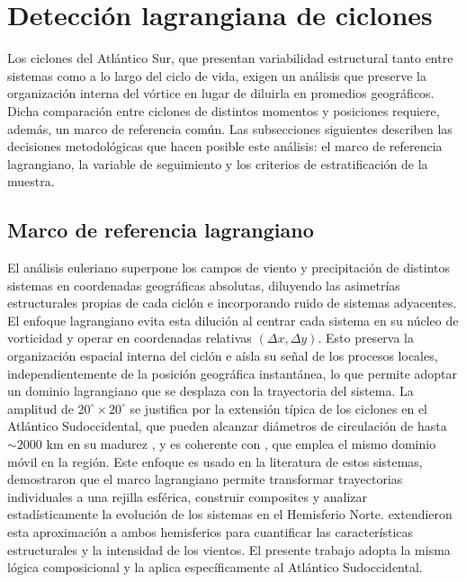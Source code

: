 \section{Detección lagrangiana de ciclones}\label{sec:tb_vorticidad}
Los ciclones del Atlántico Sur, que presentan variabilidad estructural tanto entre sistemas como a lo largo del ciclo de vida,
exigen un análisis que preserve la organización interna del vórtice en lugar de diluirla en promedios geográficos. 
Dicha comparación entre ciclones de distintos momentos y posiciones requiere, además, un marco de referencia común. 
Las subsecciones siguientes describen las decisiones metodológicas que hacen posible este análisis: el marco de referencia lagrangiano, la variable de seguimiento y los criterios de estratificación de la muestra.

\subsection{Marco de referencia lagrangiano}\label{subsec:tb_lagrangiano}
El análisis euleriano superpone los campos de viento y precipitación de distintos sistemas en coordenadas geográficas absolutas, diluyendo las asimetrías estructurales propias de cada ciclón e incorporando ruido de sistemas adyacentes.
El enfoque lagrangiano evita esta dilución al centrar cada sistema en su núcleo de vorticidad y operar en coordenadas relativas $(\Delta x, \Delta y)$. 
Esto preserva la organización espacial interna del ciclón e aísla su señal de los procesos locales, independientemente de la posición geográfica instantánea, lo que permite adoptar un dominio lagrangiano que se desplaza con la trayectoria del sistema.
La amplitud de $20^{\circ} \times 20^{\circ}$ se justifica por la extensión típica de los ciclones en el Atlántico Sudoccidental, que pueden alcanzar diámetros de circulación de hasta ${\sim}2000$ km en su madurez \citep{gramcianinov2020analysis}, y es coherente con \citet{cardoso2022synoptic}, que emplea el mismo dominio móvil en la región.
Este enfoque es usado en la literatura de estos sistemas, \citet{laurila2021characteristics} demostraron que el marco lagrangiano permite transformar trayectorias individuales a una rejilla esférica, construir composites y analizar estadísticamente la evolución de los sistemas en el Hemisferio Norte.
\citet{priestley2022improved} extendieron esta aproximación a ambos hemisferios para cuantificar las características estructurales y la intensidad de los vientos. 
El presente trabajo adopta la misma lógica composicional y la aplica específicamente al Atlántico Sudoccidental.


